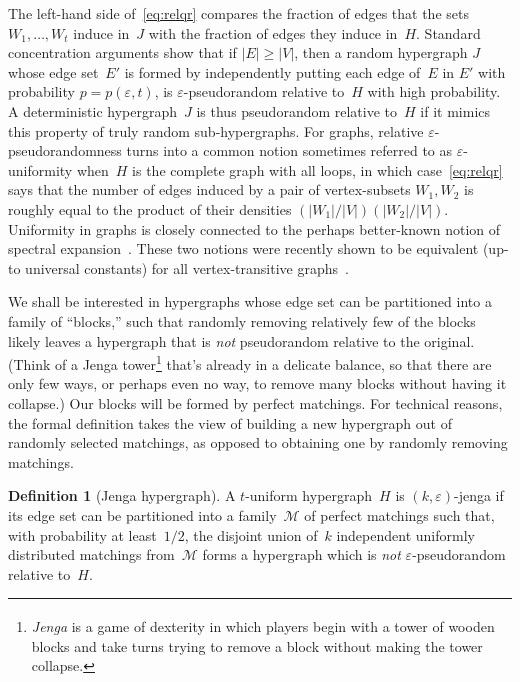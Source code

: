 \documentclass[11pt]{article}
\numberwithin{equation}{section}
\theoremstyle{definition}
\newtheorem{definition}[theorem]{Definition}
\theoremstyle{plain}
\newcommand{\eps}{\varepsilon}
\begin{document}
The left-hand side of~\eqref{eq:relqr} compares the fraction of edges that the sets $W_1,\dots,W_t$ induce in~$J$ with the fraction of edges they induce in~$H$.
Standard concentration arguments show that if $|E| \geq |V|$, then a random hypergraph $J$ whose edge set~$E'$ is formed by independently putting each edge of~$E$ in $E'$ with probability $p = p(\eps,t)$, is $\eps$-pseudorandom relative to~$H$ with high probability.
A deterministic hypergraph~$J$ is thus pseudorandom relative to~$H$ if it mimics this property of truly random sub-hypergraphs.
For graphs, relative $\eps$-pseudorandomness turns into a common notion sometimes referred to as $\eps$-uniformity when~$H$ is the complete graph with all loops, in which case~\eqref{eq:relqr} says that the number of edges induced by a pair of vertex-subsets $W_1,W_2$ is roughly equal to the product of their densities $(|W_1|/|V|)(|W_2|/|V|)$.
Uniformity in graphs is closely connected to the perhaps better-known notion of spectral expansion~\cite{Hoory:2006}.
These two notions were recently shown to be equivalent  (up-to universal constants) for all vertex-transitive graphs~\cite{Conlon:2016}.

We shall be interested in hypergraphs whose edge set can be partitioned into a family of ``blocks,'' such that randomly removing relatively few of the blocks  likely leaves a hypergraph that is \emph{not} pseudorandom relative to the original.
(Think of a Jenga tower\footnote{\emph{Jenga}\textsuperscript{\textregistered} is a game of dexterity in which players begin with a tower of wooden blocks and take turns trying to remove a block without making the tower collapse.} that's already in a delicate balance, so that there are only few ways, or perhaps even no way, to remove many blocks without having it collapse.)
Our blocks will be formed by perfect matchings.
For technical reasons, the formal definition takes the view of building a new hypergraph out of randomly selected matchings, as opposed to obtaining one by randomly removing matchings.

\begin{definition}[Jenga hypergraph]
A $t$-uniform hypergraph~$H$ is $(k,\eps)$-jenga if its edge set can be partitioned into a family~$\mathcal M$ of perfect matchings
such that, with probability at least~$1/2$, the disjoint union of~$k$ independent uniformly distributed matchings from~$\mathcal M$ forms a hypergraph which is \emph{not} $\eps$-pseudorandom relative to~$H$.
\end{definition}
\end{document}
